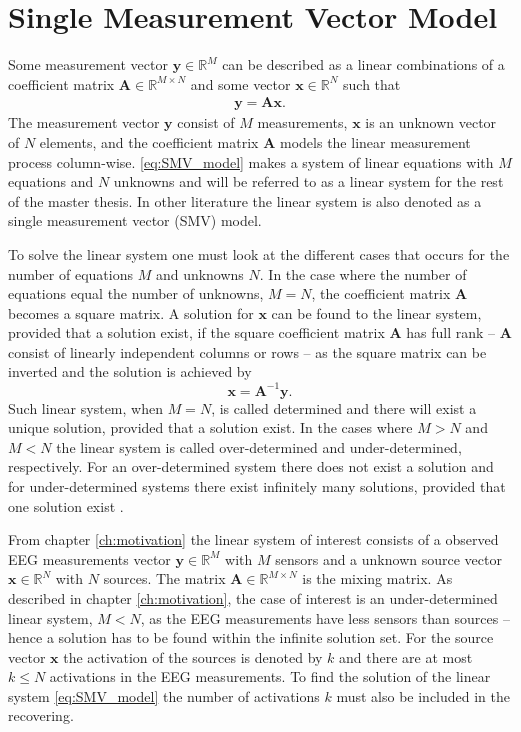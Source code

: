 \section{Single Measurement Vector Model}
Some measurement vector $\mathbf{y} \in \mathbb{R}^M$ can be described as a linear combinations of a coefficient matrix $\mathbf{A} \in \mathbb{R}^{M \times N}$ and some vector $\mathbf{x} \in \mathbb{R}^N$ such that
\begin{align}\label{eq:SMV_model}
\mathbf{y} = \mathbf{Ax}.
\end{align}
The measurement vector $\mathbf{y}$ consist of $M$ measurements, $\mathbf{x}$ is an unknown vector of $N$ elements, and the coefficient matrix $\mathbf{A}$ models the linear measurement process column-wise. 
\ref{eq:SMV_model} makes a system of linear equations with $M$ equations and $N$ unknowns and will be referred to as a linear system for the rest of the master thesis. In other literature the linear system is also denoted as a single measurement vector (SMV) model.

To solve the linear system one must look at the different cases that occurs for the number of equations $M$ and unknowns $N$.
In the case where the number of equations equal the number of unknowns, $M = N$, the coefficient matrix $\mathbf{A}$ becomes a square matrix. 
A solution for $\mathbf{x}$ can be found to the linear system, provided that a solution exist, if the square coefficient matrix $\mathbf{A}$ has full rank -- $\mathbf{A}$ consist of linearly independent columns or rows -- as the square matrix can be inverted and the solution is achieved by 
$$
\mathbf{x} = \mathbf{A}^{-1} \mathbf{y}.
$$
Such linear system, when $M = N$, is called determined and there will exist a unique solution, provided that a solution exist. 
In the cases where $M > N$ and $M < N$ the linear system is called over-determined and under-determined, respectively. 
For an over-determined system there does not exist a solution and for under-determined systems there exist infinitely many solutions, provided that one solution exist \cite[p. ix]{CS} .

From chapter \ref{ch:motivation} the linear system of interest consists of a observed EEG measurements vector $\mathbf{y} \in \mathbb{R}^M$ with $M$ sensors and a unknown source vector $\mathbf{x} \in \mathbb{R}^N$ with $N$ sources. The matrix $\mathbf{A} \in \mathbb{R}^{M \times N}$ is the mixing matrix.
As described in chapter \ref{ch:motivation}, the case of interest is an under-determined linear system, $M < N$, as the EEG measurements have less sensors than sources -- hence a solution has to be found within the infinite solution set. For the source vector $\mathbf{x}$ the activation of the sources is denoted by $k$ and there are at most $k \leq N$ activations in the EEG measurements. 
To find the solution of the linear system \eqref{eq:SMV_model} the number of activations $k$ must also be included in the recovering.

